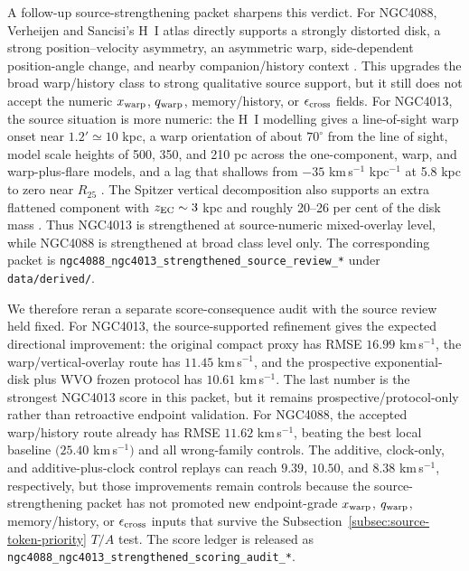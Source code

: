 \documentclass[11pt]{article}
\begin{document}
A follow-up source-strengthening packet sharpens this verdict.  For NGC4088,
Verheijen and Sancisi's H~I atlas directly supports a strongly distorted disk,
a strong position--velocity asymmetry, an asymmetric warp, side-dependent
position-angle change, and nearby companion/history context
\cite{VerheijenSancisi2001UrsaMajorHI}.  This upgrades the broad
warp/history class to strong qualitative source support, but it still does not
accept the numeric \(x_{\rm warp}\), \(q_{\rm warp}\), memory/history, or
\(\epsilon_{\rm cross}\) fields.  For NGC4013, the source situation is more
numeric: the H~I modelling gives a line-of-sight warp onset near
\(1.2'\simeq 10\) kpc, a warp orientation of about \(70^\circ\) from the line
of sight, model scale heights of 500, 350, and 210 pc across the one-component,
warp, and warp-plus-flare models, and a lag that shallows from
\(-35\) km\,s\(^{-1}\) kpc\(^{-1}\) at 5.8 kpc to zero near \(R_{25}\)
\cite{ZschaechnerRand2015NGC4013HI}.  The Spitzer vertical decomposition also
supports an extra flattened component with \(z_{\rm EC}\sim 3\) kpc and
roughly 20--26 per cent of the disk mass
\cite{Comeron2011NGC4013Vertical}.  Thus NGC4013 is strengthened at
source-numeric mixed-overlay level, while NGC4088 is strengthened at broad
class level only.  The corresponding packet is
\texttt{ngc4088\_ngc4013\_strengthened\_source\_review\_*} under
\texttt{data/derived/}.

We therefore reran a separate score-consequence audit with the source review
held fixed.  For NGC4013, the source-supported refinement gives the expected
directional improvement: the original compact proxy has RMSE \(16.99\)
km\,s\(^{-1}\), the warp/vertical-overlay route has \(11.45\)
km\,s\(^{-1}\), and the prospective exponential-disk plus WVO frozen protocol
has \(10.61\) km\,s\(^{-1}\).  The last number is the strongest NGC4013 score
in this packet, but it remains prospective/protocol-only rather than
retroactive endpoint validation.  For NGC4088, the accepted warp/history route
already has RMSE \(11.62\) km\,s\(^{-1}\), beating the best local baseline
\((25.40\) km\,s\(^{-1})\) and all wrong-family controls.  The additive,
clock-only, and additive-plus-clock control replays can reach \(9.39\),
\(10.50\), and \(8.38\) km\,s\(^{-1}\), respectively, but those improvements
remain controls because the source-strengthening packet has not promoted new
endpoint-grade \(x_{\rm warp}\), \(q_{\rm warp}\), memory/history, or
\(\epsilon_{\rm cross}\) inputs that survive the
Subsection~\ref{subsec:source-token-priority} \(T/A\) test.  The score ledger is released as
\texttt{ngc4088\_ngc4013\_strengthened\_scoring\_audit\_*}.
\end{document}
